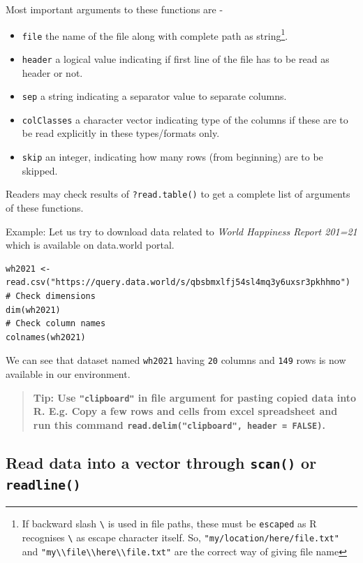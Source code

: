 \documentclass[
]{book}
\providecommand{\tightlist}{%
  \setlength{\itemsep}{0pt}\setlength{\parskip}{0pt}}
\begin{document}
Most important arguments to these functions are -

\begin{itemize}
\tightlist
\item
  \texttt{file} the name of the file along with complete path as string\footnote{If backward slash \texttt{\textbackslash{}} is used in file paths, these must be \texttt{escaped} as R recognises \texttt{\textbackslash{}} as escape character itself. So, \texttt{"my/location/here/file.txt"} and \texttt{"my\textbackslash{}\textbackslash{}file\textbackslash{}\textbackslash{}here\textbackslash{}\textbackslash{}file.txt"} are the correct way of giving file name}.
\item
  \texttt{header} a logical value indicating if first line of the file has to be read as header or not.
\item
  \texttt{sep} a string indicating a separator value to separate columns.
\item
  \texttt{colClasses} a character vector indicating type of the columns if these are to be read explicitly in these types/formats only.
\item
  \texttt{skip} an integer, indicating how many rows (from beginning) are to be skipped.
\end{itemize}

Readers may check results of \texttt{?read.table()} to get a complete list of arguments of these functions.

Example: Let us try to download data related to \emph{World Happiness Report 201=21} which is available on data.world portal.

\begin{verbatim}
wh2021 <- read.csv("https://query.data.world/s/qbsbmxlfj54sl4mq3y6uxsr3pkhhmo")
# Check dimensions
dim(wh2021)
# Check column names
colnames(wh2021)
\end{verbatim}

We can see that dataset named \texttt{wh2021} having \texttt{20} columns and \texttt{149} rows is now available in our environment.

\begin{quote}
\textbf{Tip: Use \texttt{"clipboard"} in file argument for pasting copied data into R. E.g. Copy a few rows and cells from excel spreadsheet and run this command \texttt{read.delim("clipboard",\ header\ =\ FALSE)}.}
\end{quote}

\hypertarget{read-data-into-a-vector-through-scan-or-readline}{%
\subsection*{\texorpdfstring{Read data into a vector through \texttt{scan()} or \texttt{readline()}}{Read data into a vector through scan() or readline()}}\label{read-data-into-a-vector-through-scan-or-readline}}
\end{document}
